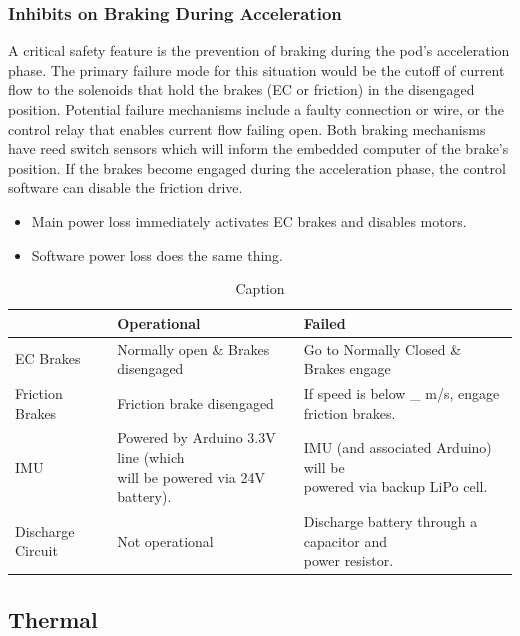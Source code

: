 \documentclass[main.tex]{subfiles}
\begin{document}
    \subsubsection{Inhibits on Braking During Acceleration}
    A critical safety feature is the prevention of braking during the pod's acceleration phase. The primary failure mode for this situation would be the cutoff of current flow to the solenoids that hold the brakes (EC or friction) in the disengaged position. Potential failure mechanisms include a faulty connection or wire, or the control relay that enables current flow failing open. Both braking mechanisms have reed switch sensors which will inform the embedded computer of the brake's position. If the brakes become engaged during the acceleration phase, the control software can disable the friction drive.
    \begin{itemize}
        \item Main power loss immediately activates EC brakes and disables motors.
        \item Software power loss does the same thing.
    \end{itemize}
    \begin{table}[H]
        \centering
        \begin{tabular}{@{}lll@{}} \toprule
            & Operational & Failed\\ \midrule
            EC Brakes & Normally open \& Brakes disengaged & Go to Normally Closed \& Brakes engage\\
            Friction Brakes & Friction brake disengaged & If speed is below \_ m/s, engage friction brakes.\\
            IMU & \makecell[l]{Powered by Arduino 3.3V line (which \\ will be powered via 24V battery).} & \makecell[l]{IMU (and associated Arduino) will be \\ powered via backup LiPo cell.}\\
            Discharge Circuit & Not operational & \makecell[l]{Discharge battery through a capacitor and \\ power resistor.}\\ \bottomrule
        \end{tabular}
        \caption{Caption}
    \end{table}
    
    \subsection{Thermal}
\end{document}
